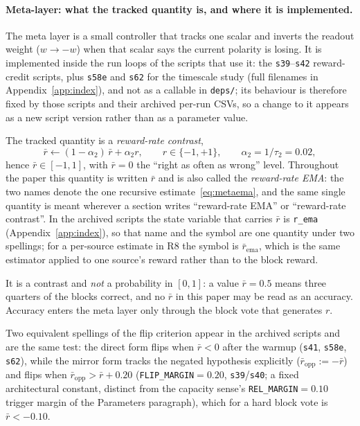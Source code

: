 \documentclass[preprint,12pt]{elsarticle}
\begin{document}
\paragraph{Meta-layer: what the tracked quantity is, and where it is
implemented.} The meta layer is a small controller that tracks one scalar and
inverts the readout weight ($w\to-w$) when that scalar says the current
polarity is losing. It is implemented inside the run loops of the scripts that
use it: the \texttt{s39}--\texttt{s42} reward-credit scripts, plus
\texttt{s58e} and \texttt{s62} for the timescale study (full filenames in
Appendix~\ref{app:index}), and not as a callable in
\texttt{deps/}; its behaviour is therefore fixed by those scripts and their
archived per-run CSVs, so a change to it appears as a new script version
rather than as a parameter value.

The tracked quantity is a \emph{reward-rate
contrast},
\begin{equation}
\label{eq:metaema}
\bar r \leftarrow (1-\alpha_2)\,\bar r+\alpha_2 r,
\qquad r\in\{-1,+1\},\qquad \alpha_2=1/\tau_2=0.02 ,
\end{equation}
hence $\bar r\in[-1,1]$, with $\bar r=0$ the ``right as often as wrong''
level. Throughout the paper this quantity is written $\bar r$ and is also
called the \emph{reward-rate EMA}: the two names denote the one recursive
estimate~\eqref{eq:metaema}, and the same single quantity is meant wherever a
section writes ``reward-rate EMA'' or ``reward-rate contrast''. In the
archived scripts the state variable that carries $\bar r$ is
\texttt{r\_ema} (Appendix~\ref{app:index}), so that name and the symbol are one
quantity under two spellings; for a
per-source estimate in R8 the symbol is $\bar r_{\mathrm{ema}}$, which is the
same estimator applied to one source's reward rather than to the block reward.

It is a contrast and
\emph{not} a probability in $[0,1]$: a value
$\bar r=0.5$ means three quarters of the blocks correct, and no $\bar r$ in
this paper may be read as an accuracy. Accuracy enters the meta layer only
through the block vote that generates $r$.

Two equivalent spellings of the
flip criterion appear in the archived scripts and are the same test: the
direct form flips when $\bar r<0$ after the warmup (\texttt{s41},
\texttt{s58e}, \texttt{s62}), while the mirror form tracks the negated
hypothesis explicitly ($\bar r_{\mathrm{opp}}:=-\bar r$) and flips when
$\bar r_{\mathrm{opp}}>\bar r+0.20$ (\texttt{FLIP\_MARGIN}$=0.20$,
\texttt{s39}/\texttt{s40}; a fixed architectural constant, distinct from the
capacity sense's \texttt{REL\_MARGIN}$=0.10$ trigger margin of the
Parameters paragraph),
which for a hard block vote is $\bar r<-0.10$.
\end{document}
